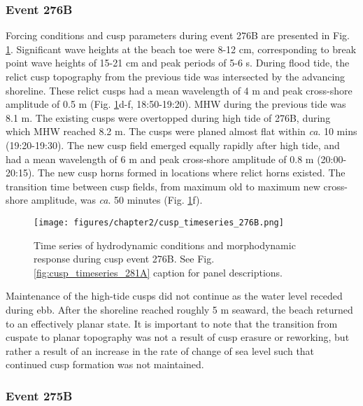 \subsubsection{Event 276B}\label{276B}

Forcing conditions and cusp parameters during event 276B are presented in Fig. \ref{fig:cusp_timeseries_276B}. Significant wave heights at the beach toe were 8-12 cm, corresponding to break point wave heights of 15-21 cm and peak periods of 5-6 s. During flood tide, the relict cusp topography from the previous tide was intersected by the advancing shoreline. These relict cusps had a mean wavelength of 4 m and peak cross-shore amplitude of 0.5 m (Fig. \ref{fig:cusp_timeseries_276B}d-f, 18:50-19:20). MHW during the previous tide was 8.1 m. The existing cusps were overtopped during high tide of 276B, during which MHW reached 8.2 m. The cusps were planed almost flat within \textit{ca}. 10 mins (19:20-19:30). The new cusp field emerged equally rapidly after high tide, and had a mean wavelength of 6 m and peak cross-shore amplitude of 0.8 m (20:00-20:15). The new cusp horns formed in locations where relict horns existed. The transition time between cusp fields, from maximum old to maximum new cross-shore amplitude, was \textit{ca}. 50 minutes (Fig. \ref{fig:cusp_timeseries_276B}f).

\begin{figure}[tbp] %
 	\texttt{[image: figures/chapter2/cusp\_timeseries\_276B.png]}
	\caption[Cusp horn dynamics: yearday 276]{Time series of hydrodynamic conditions and morphodynamic response during cusp event 276B. See Fig. \ref{fig:cusp_timeseries_281A} caption for panel descriptions.}
	\label{fig:cusp_timeseries_276B}
\end{figure}

Maintenance of the high-tide cusps did not continue as the water level receded during ebb. After the shoreline reached roughly 5 m seaward, the beach returned to an effectively planar state. It is important to note that the transition from cuspate to planar topography was not a result of cusp erasure or reworking, but rather a result of an increase in the rate of change of sea level such that continued cusp formation was not maintained.     


\subsubsection{Event 275B}\label{275B}

